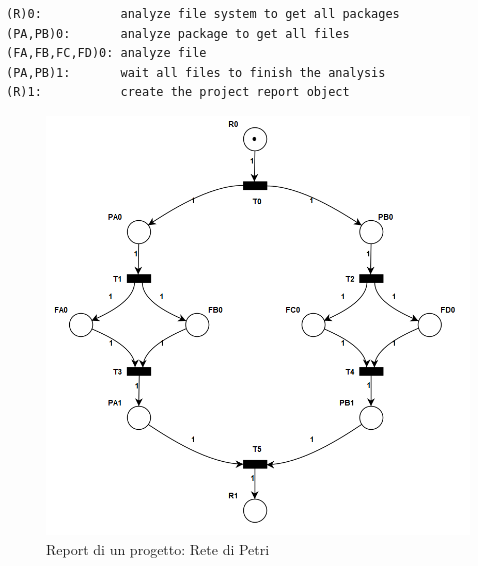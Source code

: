 \documentclass[12pt,a4paper,openright,twoside]{book}
\begin{document}
\begin{lstlisting}[label=lst:projectReport,caption=Pseudocodice della creazione del Report di un progetto]
(R)0:           analyze file system to get all packages
(PA,PB)0:       analyze package to get all files
(FA,FB,FC,FD)0: analyze file
(PA,PB)1:       wait all files to finish the analysis
(R)1:           create the project report object
\end{lstlisting}

\begin{figure}[H]
	\centering
	\includegraphics[width=1\linewidth]{figures/assignment-02_project-report_petri-net.png}
	\caption{Report di un progetto: Rete di Petri}
	\label{fig:petri-net_project-report}
\end{figure}
\end{document}
